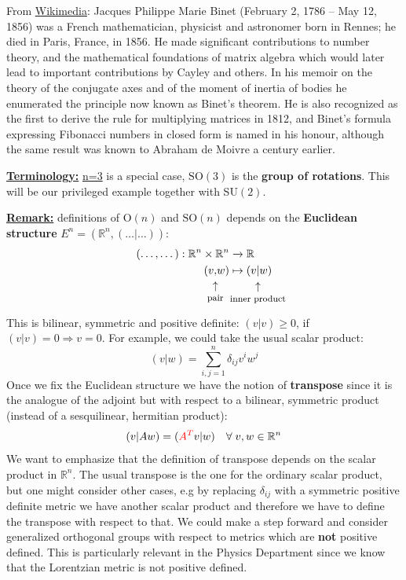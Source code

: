 \documentclass[../main.tex]{subfiles}
\begin{document}
\begin{marginfigure}
	\caption[A portrait of Jacques Philippe Marie Binet]{From \href{https://commons.wikimedia.org/wiki/File:Jacques_Binet.jpg?uselang=it}{Wikimedia}: Jacques Philippe Marie Binet (February 2, 1786 – May 12, 1856) was a French mathematician, physicist and astronomer born in Rennes; he died in Paris, France, in 1856. He made significant contributions to number theory, and the mathematical foundations of matrix algebra which would later lead to important contributions by Cayley and others. In his memoir on the theory of the conjugate axes and of the moment of inertia of bodies he enumerated the principle now known as Binet's theorem. He is also recognized as the first to derive the rule for multiplying matrices in 1812, and Binet's formula expressing Fibonacci numbers in closed form is named in his honour, although the same result was known to Abraham de Moivre a century earlier.}
\end{marginfigure}
\underline{\textbf{Terminology:}} \underline{n=3} is a special case, $\textrm{SO}(3)$ is the \textbf{group of rotations}. This will be our privileged example together with SU$(2).$

\underline{\textbf{Remark:}} definitions of $\textrm{O}(n)$ and $\textrm{SO}(n)$ depends on the \textbf{Euclidean structure} $E^n=(\mathbb{R}^n,(\dots|\dots))$:
\begin{align*}
(\dots,\dots):\mathbb{R}^n\times\mathbb{R}^n&\xrightarrow[]{}\mathbb{R}\\
              (v\underset{\mathclap{\tikz \node {$\uparrow$} node [below=1ex] {\footnotesize pair };}},w) &\mapsto (v\underset{\mathclap{\tikz \node {$\uparrow$} node [below=1ex] {\footnotesize inner product };}}|w)
\end{align*}
This is bilinear, symmetric and positive definite: $(v|v)\ge 0$, if $(v|v)=0\Rightarrow{}v=0$. For example, we could take the usual scalar product:
\[
(v|w)=\sum_{i,j=1}^n\delta_{ij}v^iw^j
\]
Once we fix the Euclidean structure we have the notion of \textbf{transpose} since it is the analogue of the adjoint but with respect to a bilinear, symmetric product (instead of a sesquilinear, hermitian product):
\[
(v|Aw)=({\color{red}A^T}v|w) \quad \forall\; v,w\in\mathbb{R}^n
\]
We want to emphasize that the definition of transpose depends on the scalar product in $\mathbb{R}^n$. The usual transpose is the one for the ordinary scalar product, but one might consider other cases, e.g by replacing $\delta_{ij}$ with a symmetric positive definite metric we have another scalar product and therefore we have to define the transpose with respect to that. We could make a step forward and consider generalized orthogonal groups with respect to metrics which are \textbf{not} positive defined. This is particularly relevant in the Physics Department since we know that the Lorentzian metric is not positive defined.
\end{document}
